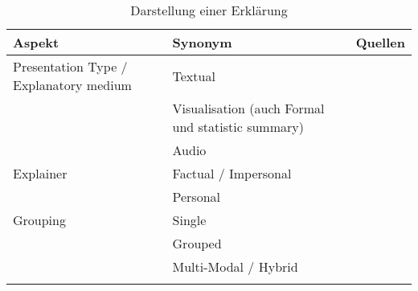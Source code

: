 \begin{longtable}{|p{}|p{}|p{}|}
    \hline
    \textbf{Aspekt}     & \textbf{Synonym} & \textbf{Quellen} \\ \hline
    Presentation Type / Explanatory medium
                        & Textual  & \cite{sokol_explainability_2020} \cite{balog_measuring_2020} \cite{tintarev_designing_nodate} \cite{sato_action-triggering_2019} \cite{eiband_impact_2019} \cite{eiband_impact_2019} \cite{abdulrahman_belief-based_2019} \cite{cassens_ambient_2019} \cite{nunes_systematic_2017} \\
                        & Visualisation (auch Formal und statistic summary) & \cite{sokol_explainability_2020} \cite{sato_action-triggering_2019} \cite{sokol_explainability_2020}  \cite{mucha_interfaces_2021} \cite{abdulrahman_belief-based_2019} \cite{nunes_systematic_2017} \cite{schrills_color_2020} \\
                       
                        & Audio & \cite{wiegand2019drive} \cite{nunes_systematic_2017} \cite{wang_is_2018} \\
    \hline
    Explainer           & Factual / Impersonal & \cite{eiband_impact_2019} \cite{abdulrahman_belief-based_2019} \cite{kunkel_let_2019} \cite{neerincx_using_2018} \\
                        & Personal & \cite{abdulrahman_belief-based_2019} \cite{kunkel_let_2019} \cite{weitz_you_2019} \cite{zahedi_towards_2019} \cite{neerincx_using_2018} \\
    \hline
    Grouping            & Single & \cite{nunes_systematic_2017} \cite{balog_measuring_2020} \cite{sato_action-triggering_2019} \cite{eiband_impact_2019} \cite{abdulrahman_belief-based_2019} \\
                        & Grouped & \cite{nunes_systematic_2017} \cite{balog_measuring_2020} \cite{tintarev_designing_nodate} \\
                        & Multi-Modal / Hybrid & \cite{sato_action-triggering_2019} \cite{abdulrahman_belief-based_2019} \cite{cassens_ambient_2019} \\
    \hline
\caption{Darstellung einer Erklärung}
\label{tab:presentation_of_explanations}
\end{longtable}